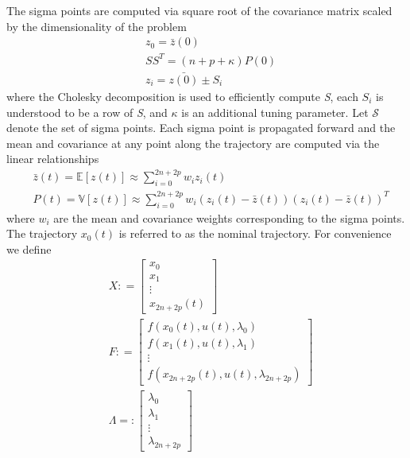 \documentclass[10pt,a4paper]{article}
\begin{document}
	The sigma points are computed via square root of the covariance matrix scaled by the dimensionality of the problem
	\begin{align}
	&z_0 = \bar{z}(0) \\
	&SS^T = (n+p+\kappa)P(0) \\
	&z_i = \bar{z(0)} \pm S_i 
	\end{align}
	where the Cholesky decomposition is used to efficiently compute \textit{S}, each $S_i$ is understood to be a row of \textit{S}, and $\kappa$ is an additional tuning parameter. Let $\mathcal{S}$ denote the set of sigma points. Each sigma point is propagated forward and the mean and covariance at any point along the trajectory are computed via the linear relationships
	\begin{align}
	&\bar{z}(t) = \mathbb{E}[z(t)] \approx \sum_{i=0}^{2n+2p}w_iz_i(t) \\
	&P(t) = \mathbb{V}[z(t)] \approx \sum_{i=0}^{2n+2p}w_i(z_i(t) - \bar{z}(t))(z_i(t) - \bar{z}(t))^T
	\end{align}
	where $w_i$ are the mean and covariance weights corresponding to the sigma points. The trajectory $x_0(t)$ is referred to as the nominal trajectory. For convenience we define
	\begin{align}
	&X \mathrel{:}= \left[\begin{array}{c}
	x_0\\
	x_1\\
	\vdots\\
	x_{2n+2p}(t)
	\end{array}\right] \\
	&F \mathrel{:}= \left[\begin{array}{c}
		f(x_0(t),u(t),\lambda_0)\\
		f(x_1(t),u(t),\lambda_1)\\
		\vdots \\
		f(x_{2n+2p}(t),u(t),\lambda_{2n+2p}) 
		\end{array}\right] \\
	&\Lambda = \mathrel{:}\left[\begin{array}{c}
			\lambda_0\\
			\lambda_1\\
			\vdots\\
			\lambda_{2n+2p}\end{array}\right] \\
	\end{align}
\end{document}
